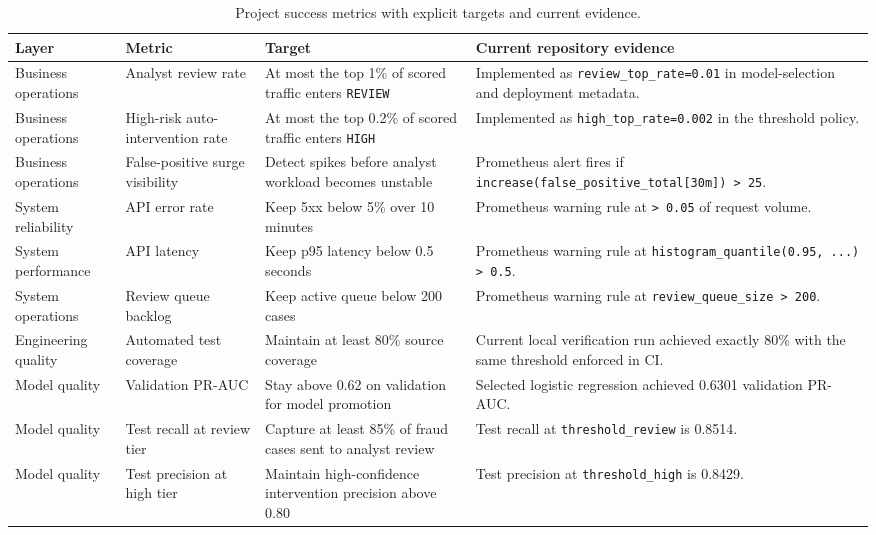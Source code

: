 \documentclass[11pt]{article}
\newcommand{\code}[1]{\texttt{#1}}
\begin{document}
\begin{table}[H]
\small
\centering
\begin{tabularx}{\textwidth}{p{}p{}p{}X}
\toprule
Layer & Metric & Target & Current repository evidence \\
\midrule
Business operations & Analyst review rate & At most the top 1\% of scored traffic enters \code{REVIEW} & Implemented as \code{review\_top\_rate=0.01} in model-selection and deployment metadata. \\
Business operations & High-risk auto-intervention rate & At most the top 0.2\% of scored traffic enters \code{HIGH} & Implemented as \code{high\_top\_rate=0.002} in the threshold policy. \\
Business operations & False-positive surge visibility & Detect spikes before analyst workload becomes unstable & Prometheus alert fires if \code{increase(false\_positive\_total[30m]) > 25}. \\
System reliability & API error rate & Keep 5xx below 5\% over 10 minutes & Prometheus warning rule at \code{> 0.05} of request volume. \\
System performance & API latency & Keep p95 latency below 0.5 seconds & Prometheus warning rule at \code{histogram\_quantile(0.95, ...) > 0.5}. \\
System operations & Review queue backlog & Keep active queue below 200 cases & Prometheus warning rule at \code{review\_queue\_size > 200}. \\
Engineering quality & Automated test coverage & Maintain at least 80\% source coverage & Current local verification run achieved exactly 80\% with the same threshold enforced in CI. \\
Model quality & Validation PR-AUC & Stay above 0.62 on validation for model promotion & Selected logistic regression achieved 0.6301 validation PR-AUC. \\
Model quality & Test recall at review tier & Capture at least 85\% of fraud cases sent to analyst review & Test recall at \code{threshold\_review} is 0.8514. \\
Model quality & Test precision at high tier & Maintain high-confidence intervention precision above 0.80 & Test precision at \code{threshold\_high} is 0.8429. \\
\bottomrule
\end{tabularx}
\caption{Project success metrics with explicit targets and current evidence.}
\end{table}
\end{document}
